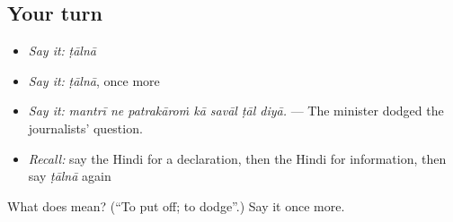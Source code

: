 \subsection*{Your turn}
\begin{itemize}
\raggedright
  \item \emph{Say it:} \emph{ṭālnā}
  \item \emph{Say it:} \emph{ṭālnā}, once more
  \item \emph{Say it:} \emph{mantrī ne patrakāroṁ kā savāl ṭāl diyā.} — The minister dodged the journalists' question.
  \item \emph{Recall:} say the Hindi for a declaration, then the Hindi for information, then say \emph{ṭālnā} again
\end{itemize}

\begin{tcolorbox}[breakable,colback=teal!4,colframe=teal!35!black,title={Before you move on}]
What does  mean? (\textquotedblleft{}To put off; to dodge\textquotedblright{}.) Say it once more.
\end{tcolorbox}
